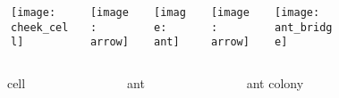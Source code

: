 \begin{figure}
\begin{columns}
\begin{column}{0.05\textwidth}
\begin{subfigure}[b]{\textwidth}
\caption{}
\label{fig:natural}
\end{subfigure}
\end{column}
\begin{column}{0.27\textwidth}
\texttt{[image: cheek\_cell]}
\end{column}
\begin{column}{0.07\textwidth}
\texttt{[image: arrow]}
\end{column}
\begin{column}{0.27\textwidth}
\texttt{[image: ant]}
\end{column}
\begin{column}{0.07\textwidth}
\texttt{[image: arrow]}
\end{column}
\begin{column}{0.27\textwidth}
\texttt{[image: ant\_bridge]}
\end{column}
\end{columns}
\vspace{1ex}
\begin{columns}
\begin{column}{0.05\textwidth}
\end{column}
\begin{column}{0.27\textwidth}
\centering
cell {\tiny\cite{clare_and_ben_2017}}
\end{column}
\begin{column}{0.07\textwidth}
\end{column}
\begin{column}{0.27\textwidth}
\centering
ant {\tiny\cite{quinzani_2008}}
\end{column}
\begin{column}{0.07\textwidth}
\end{column}
\begin{column}{0.27\textwidth}
\centering
ant colony {\tiny\cite{gallice_2011}}
\end{column}
\end{columns}
\begin{columns}
\begin{column}{0.05\textwidth}
\end{column}
\begin{column}{0.27\textwidth}
\centering

\end{column}
\end{columns}
\end{figure}
